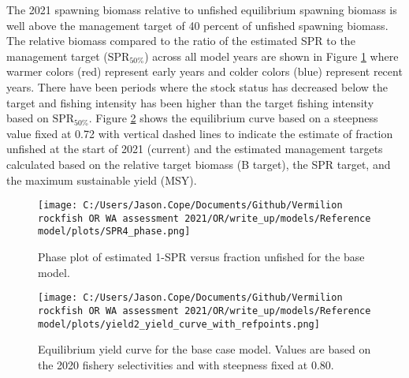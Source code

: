 \documentclass[11pt,
  english,
  a4paper,
]{article}
\begin{document}
The 2021 spawning biomass relative to unfished equilibrium spawning biomass is well above the management target of 40 percent of unfished spawning biomass. The relative biomass compared to the ratio of the estimated SPR to the management target ({\(\text{SPR}_{50\%}\)\leavevmode\tagmcend\tagstructend}) across all model years are shown in Figure \ref{fig:es-phase} where warmer colors (red) represent early years and colder colors (blue) represent recent years. There have been periods where the stock status has decreased below the target and fishing intensity has been higher than the target fishing intensity based on {\(\text{SPR}_{50\%}\)\leavevmode\tagmcend\tagstructend}. Figure \ref{fig:es-yield} shows the equilibrium curve based on a steepness value fixed at 0.72 with vertical dashed lines to indicate the estimate of fraction unfished at the start of 2021 (current) and the estimated management targets calculated based on the relative target biomass (B target), the SPR target, and the maximum sustainable yield (MSY).

\leavevmode\tagmcend\tagstructend\par


\begin{figure}
\centering
\texttt{[image: C:/Users/Jason.Cope/Documents/Github/Vermilion rockfish OR WA assessment 2021/OR/write\_up/models/Reference model/plots/SPR4\_phase.png]}
\caption{Phase plot of estimated 1-SPR versus fraction unfished for the base model.\label{fig:es-phase}}
\end{figure}

\tagmcend\tagstructend


\begin{figure}
\centering
\texttt{[image: C:/Users/Jason.Cope/Documents/Github/Vermilion rockfish OR WA assessment 2021/OR/write\_up/models/Reference model/plots/yield2\_yield\_curve\_with\_refpoints.png]}
\caption{Equilibrium yield curve for the base case model. Values are based on the 2020 fishery selectivities and with steepness fixed at 0.80.\label{fig:es-yield}}
\end{figure}
\end{document}
